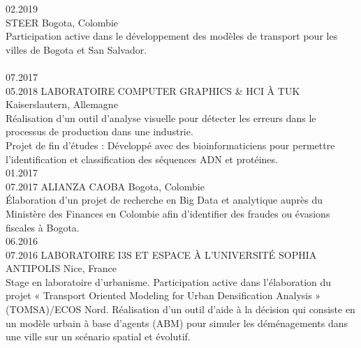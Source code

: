 \documentclass[francais]{cv-style}          %
\begin{document}
\begin{entrylist}
\entry
  {02.2019\\}
  {STEER}
  {Bogota, Colombie}
  {\\
  Participation active dans le développement des modèles de transport pour les villes de Bogota et San Salvador.\\
  \\
    {\vspace{-0.1cm}}}
\entry
  {07.2017\\05.2018}
  {LABORATOIRE COMPUTER GRAPHICS \& HCI À TUK}
  {Kaiserslautern, Allemagne}
  {\\
    Réalisation d'un outil d'analyse visuelle pour détecter les erreurs dans le processus de production dans une industrie. \\
    Projet de fin d'études : Développé avec des bioinformaticiens pour permettre l'identification et classification des séquences ADN et protéines.\\
    {\vspace{-0.1cm}}}
\entry
  {01.2017\\07.2017}
  {ALIANZA CAOBA}
  {Bogota, Colombie}
  {\\
  Élaboration d’un projet de recherche en Big Data et analytique auprès du Ministère des Finances en Colombie afin d’identifier des fraudes ou évasions fiscales à Bogota. \\
    {\vspace{-0.1cm}}}
\entry
  {06.2016\\07.2016}
  {LABORATOIRE I3S ET ESPACE À L'UNIVERSITÉ SOPHIA ANTIPOLIS}
  {Nice, France}
  {\\
  Stage en laboratoire d’urbanisme. Participation active dans l’élaboration du projet « Transport Oriented Modeling for Urban Densification Analysis » (TOMSA)/ECOS Nord. Réalisation d’un outil d’aide à la décision qui consiste en un modèle urbain à base d’agents (ABM) pour simuler les déménagements dans une ville sur un scénario spatial et évolutif. \\
    {\vspace{-0.1cm}}}


\end{entrylist}
\end{document}

